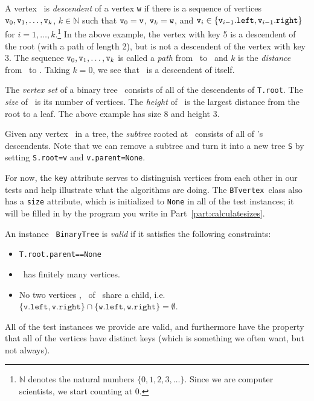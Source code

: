 \documentclass[11pt]{article}
\begin{document}
\begin{enumerate}
 A vertex \btw\ is {\em descendent} of a vertex \texttt{w} if there is a sequence of vertices $\texttt{v}_0,\texttt{v}_1,\ldots,\texttt{v}_k$, $k\in \mathbb{N}$ such that $\texttt{v}_0=\texttt{v}$, $\texttt{v}_k=\texttt{w}$, and 
 $\texttt{v}_i \in \{\texttt{v}_{i-1}.\texttt{left},\texttt{v}_{i-1}.\texttt{right}\}$ for $i=1,\ldots,k$.\footnote{$\mathbb{N}$ denotes the natural numbers $\{0,1,2,3,\ldots\}$.  Since we are computer scientists, we start counting at 0.}
 In the above example, the vertex with key 5 is a descendent of the root (with a path of length 2), but is not a descendent of the vertex with key 3.
 The sequence $\texttt{v}_0,\texttt{v}_1,\ldots,\texttt{v}_k$ is called a {\em path} from \btv\ to \btw\ and $k$ is the {\em distance} from \btv\ to \btw. Taking $k=0$, we see that \btv\ is a descendent of itself.

 The {\em vertex set} of a binary tree \treeT\ consists of all of the descendents of \texttt{T.root}. The {\em size} of \treeT\ is its number of vertices. The {\em height} of \treeT\ is the largest distance from the root to a leaf.  The above example has size 8 and height 3.
 
 Given any vertex \btv\ in a tree, the {\em subtree} rooted at \btv\ consists of all of \btv's descendents.  Note that we can remove a subtree and turn it into a new tree \texttt{S} by setting
 \texttt{S.root=v} and \texttt{v.parent=None}.

 For now, the \texttt{key} attribute serves to distinguish vertices from each other in our tests and help illustrate what the algorithms are doing.  The \texttt{BTvertex}\ class
 also has a \texttt{size} attribute, which is initialized to \texttt{None} in all of the test instances; it will be filled in by the program you write in Part~\ref{part:calculatesizes}.

 An instance \treeT\ \texttt{BinaryTree} is {\em valid} if it satisfies the following constraints: \begin{itemize}
     \item \texttt{T.root.parent==None}
     \item \treeT\ has finitely many vertices.
     \item No two vertices \btv, \btw\ of \treeT\ share a child, i.e. 
     $\{\texttt{v.left},\texttt{v.right}\} \cap \{\texttt{w.left},\texttt{w.right}\} = \emptyset$. 
 \end{itemize}
 All of the test instances we provide are valid, and furthermore have the property that all of the vertices have distinct keys (which is something we often want, but not always).


\end{enumerate}
\end{document}
